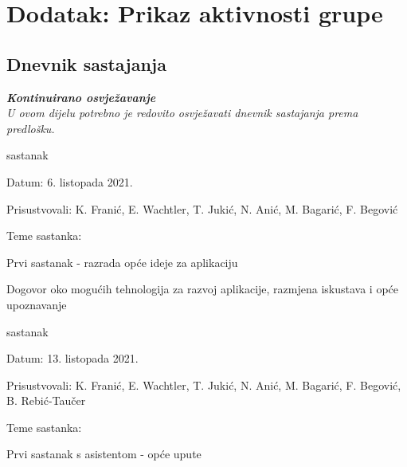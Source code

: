 \chapter*{Dodatak: Prikaz aktivnosti grupe}
		
		\section*{Dnevnik sastajanja}
		
		\textbf{\textit{Kontinuirano osvježavanje}}\\
		
		 \textit{U ovom dijelu potrebno je redovito osvježavati dnevnik sastajanja prema predlošku.}
		
		\begin{packed_enum}
			\item  sastanak
			
			\item[] \begin{packed_item}
				\item Datum: 6. listopada 2021.
				\item Prisustvovali: K. Franić, E. Wachtler, T. Jukić, N. Anić, M. Bagarić, F. Begović
				\item Teme sastanka:
				\begin{packed_item}
					\item  Prvi sastanak - razrada opće ideje za aplikaciju
					\item  Dogovor oko mogućih tehnologija za razvoj aplikacije, razmjena iskustava i opće upoznavanje
				\end{packed_item}
			\end{packed_item}
			
			\item  sastanak
			\item[] \begin{packed_item}
				\item Datum: 13. listopada 2021.
				\item Prisustvovali: K. Franić, E. Wachtler, T. Jukić, N. Anić, M. Bagarić, F. Begović, B. Rebić-Taučer
				\item Teme sastanka:
				\begin{packed_item}
					\item  Prvi sastanak s asistentom - opće upute
				\end{packed_item}
			\end{packed_item}
		

\end{packed_enum}
